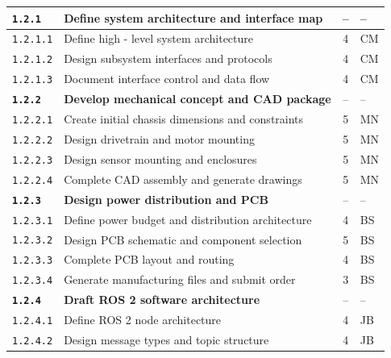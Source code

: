 \begin{longtable} { | l | p{6.5cm} | c | l | }
\rowcolor {
  designyellow !35
}
\texttt{\textbf{1.2.1}} & \textbf{Define system architecture and
                                  interface map} &
    --&-- \\
\hline
\rowcolor {
  white
}
\texttt{1.2.1.1} & \quad Define high - level system architecture & 4 & CM \\
\hline
\rowcolor {
  designyellow !15
}
\texttt{1.2.1.2} & \quad Design subsystem interfaces and protocols & 4 & CM \\
\hline
\rowcolor {
  white
}
\texttt{1.2.1.3} & \quad Document interface control and data flow & 4 & CM \\
\hline
\rowcolor {
  designyellow !35
}
\texttt{\textbf{1.2.2}} & \textbf{Develop mechanical concept and CAD package} &
    --&-- \\
\hline
\rowcolor {
  designyellow !15
}
\texttt{1.2.2.1} & \quad Create initial chassis dimensions and constraints & 5 &
    MN \\
\hline
\rowcolor {
  white
}
\texttt{1.2.2.2} & \quad Design drivetrain and motor mounting & 5 & MN \\
\hline
\rowcolor {
  designyellow !15
}
\texttt{1.2.2.3} & \quad Design sensor mounting and enclosures & 5 & MN \\
\hline
\rowcolor {
  white
}
\texttt{1.2.2.4} & \quad Complete CAD assembly and generate drawings & 5 & MN \\
\hline
\rowcolor {
  designyellow !35
}
\texttt{\textbf{1.2.3}} & \textbf{Design power distribution and PCB} & --&-- \\
\hline
\rowcolor {
  designyellow !15
}
\texttt{1.2.3.1} & \quad Define power budget and distribution architecture & 4 &
    BS \\
\hline
\rowcolor {
  white
}
\texttt{1.2.3.2} & \quad Design PCB schematic and component selection & 5 & BS \\
\hline
\rowcolor {
  designyellow !15
}
\texttt{1.2.3.3} & \quad Complete PCB layout and routing & 4 & BS \\
\hline
\rowcolor {
  white
}
\texttt{1.2.3.4} & \quad Generate manufacturing files and submit order & 3 & BS \\
\hline
\rowcolor {
  designyellow !35
}
\texttt{\textbf{1.2.4}} & \textbf{Draft ROS 2 software architecture} & --&-- \\
\hline
\rowcolor {
  designyellow !15
}
\texttt{1.2.4.1} & \quad Define ROS 2 node architecture & 4 & JB \\
\hline
\rowcolor {
  white
}
\texttt{1.2.4.2} & \quad Design message types and topic structure & 4 & JB \\

\end{longtable}
